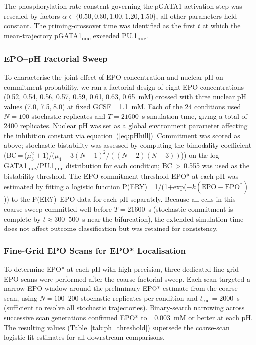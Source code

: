 The phosphorylation rate constant governing the pGATA1 activation step was
rescaled by factors $\alpha \in \{0.50, 0.80, 1.00, 1.20, 1.50\}$, all other
parameters held constant. The priming-crossover time was identified as the first
$t$ at which the mean-trajectory pGATA1\textsubscript{nuc} exceeded
PU.1\textsubscript{nuc}.

\subsubsection*{EPO--pH Factorial Sweep}

To characterise the joint effect of EPO concentration and nuclear pH on
commitment probability, we ran a factorial design of eight EPO concentrations
(0.52, 0.54, 0.56, 0.57, 0.59, 0.61, 0.63, 0.65~mM) crossed with three nuclear
pH values (7.0, 7.5, 8.0) at fixed GCSF\,=\,1.1~mM. Each of the 24 conditions
used $N=100$ stochastic replicates and $T=21600$~s simulation time, giving a
total of 2400 replicates. Nuclear pH was set as a global environment parameter
affecting the inhibition constant via equation~(\ref{eq:pHhill}). Commitment was
scored as above; stochastic bistability was assessed by computing the bimodality
coefficient (BC\,=\,($\mu_3^2+1$)/($\mu_4+3(N-1)^2/((N-2)(N-3))$)) on the
log\,GATA1\textsubscript{nuc}/PU.1\textsubscript{nuc} distribution for each
condition; BC\,$>$\,0.555 was used as the bistability threshold. The EPO
commitment threshold EPO* at each pH was estimated by fitting a logistic function
P(ERY)\,=\,1/(1+exp($-k(\text{EPO}-\text{EPO}^*)$)) to the P(ERY)--EPO data for
each pH separately. Because all cells in this coarse sweep committed well before
$T=21600$~s (stochastic commitment is complete by $t\approx 300$--$500$~s near
the bifurcation), the extended simulation time does not affect outcome
classification but was retained for consistency.

\subsubsection*{Fine-Grid EPO Scans for EPO* Localisation}

To determine EPO* at each pH with high precision, three dedicated fine-grid EPO
scans were performed after the coarse factorial sweep. Each scan targeted a
narrow EPO window around the preliminary EPO* estimate from the coarse scan,
using $N=100$--$200$ stochastic replicates per condition and
$t_{\mathrm{end}}=2000$~s (sufficient to resolve all stochastic trajectories).
Binary-search narrowing across successive scan generations confirmed EPO* to
±0.003~mM or better at each pH. The resulting values (Table~\ref{tab:ph_threshold})
supersede the coarse-scan logistic-fit estimates for all downstream comparisons.

